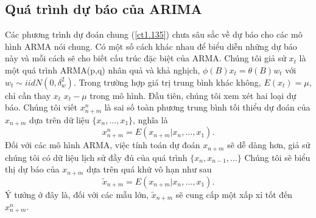\documentclass[12pt, a4paper,oneside]{book}
\theoremstyle{definition}
\begin{document}
\subsection*{Quá trình dự báo của ARIMA}
Các phương trình dự đoán chung (\ref{ct1.135}) chưa sâu sắc về dự báo cho các mô hình ARMA nói chung. Có một số cách khác nhau để biểu diễn những dự báo này và mỗi cách sẽ cho biết cấu trúc đặc biệt của ARMA. Chúng tôi giả sử $x_{t}$ là một quá trình ARMA(p,q) nhân quả và khả nghịch, $\phi(B)x_{t} = \theta(B)w_{t}$ với $w_{t} \sim iid N(0,\delta_{w}^{2})$. Trong trường hợp giá trị trung bình khác không, $E(x_{t})=\mu$, chỉ cần thay $x_{t}$ $x_{t}-\mu$ trong mô hình. Đầu tiên, chúng tôi xem xét hai loại dự báo. Chúng tôi viết $x_{n+m}^{n}$ là sai số toàn phương trung bình tối thiểu dự đoán của $x_{n+m}$ dựa trên dữ liệu $\{x_{n},...,x_{1}\}$, nghĩa là
$$x_{n+m}^{n} = E(x_{n+m}|x_{n},...,x_{1}).$$
Đối với các mô hình ARMA, việc tính toán dự đoán $x_{n+m}$ sẽ dễ dàng hơn, giả sử chúng tôi có dữ liệu lịch sử đầy đủ của quá trình $\{x_{n},x_{n-1},...\}$ Chúng tôi sẽ biểu thị dự báo của $x_{n+m}$ dựa trên quá khứ vô hạn như sau 
$$\tilde{x}_{n+m} = E(x_{n+m}|x_{n},...,x_{1}).$$
Ý tưởng ở đây là, đối với các mẫu lớn, $\tilde{x}_{n+m}$ sẽ cung cấp một xấp xỉ tốt đến $x_{n+m}^{n}$.
  
\end{document}
